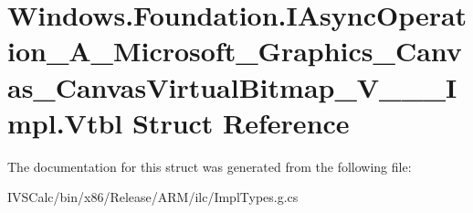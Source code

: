\hypertarget{struct_windows_1_1_foundation_1_1_i_async_operation___a___microsoft___graphics___canvas___canvas6c436e41e03213630a92c210716ec023}{}\section{Windows.\+Foundation.\+I\+Async\+Operation\+\_\+\+A\+\_\+\+Microsoft\+\_\+\+Graphics\+\_\+\+Canvas\+\_\+\+Canvas\+Virtual\+Bitmap\+\_\+\+V\+\_\+\+\_\+\+\_\+\+Impl.\+Vtbl Struct Reference}
\label{struct_windows_1_1_foundation_1_1_i_async_operation___a___microsoft___graphics___canvas___canvas6c436e41e03213630a92c210716ec023}


The documentation for this struct was generated from the following file\+:\begin{DoxyCompactItemize}
\item 
I\+V\+S\+Calc/bin/x86/\+Release/\+A\+R\+M/ilc/Impl\+Types.\+g.\+cs\end{DoxyCompactItemize}
